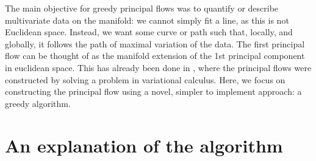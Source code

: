 \documentclass[12pt]{report}
\begin{document}
The main objective for greedy principal flows was to quantify or describe 
multivariate data on the manifold: we cannot simply fit a line, 
as this is not Euclidean space.
Instead, we want some curve or path such that, 
locally, and globally, it follows the path of maximal variation of the data. 
The first principal flow can be thought of as 
the manifold extension of the 1st principal component in euclidean space.
This has already been done in \cite{principalflow}, where the principal flows 
were constructed by solving a problem in variational calculus.
Here, we focus on constructing the principal flow using a novel, 
simpler to implement approach: a greedy algorithm.

\section{An explanation of the algorithm}
\end{document}
